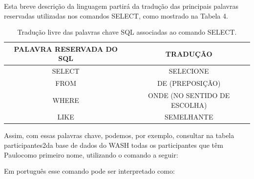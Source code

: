 \documentclass[
12pt,		%
openright,	%
twoside,  %
a4paper,			%
chapter=TITLE,		%
english,			%
french,				%
spanish,			%
brazil				%
]{USPSC-classe/USPSC}
\begin{document}
Esta breve descri\c{c}\~ao da linguagem partir\'a da tradu\c{c}\~ao das principais palavras reservadas utilizadas nos comandos SELECT, como mostrado na Tabela 4.












\begin{table}[htb]
\tiny
\caption{\label{0faf6421bd5dff6b3cb8bedd3f0b4212f1150970}Tradu\c{c}\~ao livre das palavras chave SQL associadas ao comando SELECT.}

\centering
\begin{tabular}{|c|c|}
\hline
PALAVRA RESERVADA DO SQL  &  TRADU\c{C}\~AO \\
\hline
SELECT  &  SELECIONE \\
FROM  &  DE (PREPOSI\c{C}\~AO) \\
WHERE  &  ONDE (NO SENTIDO DE ESCOLHA) \\
LIKE  &  SEMELHANTE \\
\hline
\end{tabular}
\end{table}


Assim, com essas palavras chave, podemos, por exemplo, consultar na tabela \textquotedbl participantes2\textquotedbl   da base de dados do WASH todas os participantes que t\^em \textquotedbl Paulo\textquotedbl  como primeiro nome, utilizando o comando a seguir:









\noindent\begin{center}\mbox{\centering{}}\end{center}


Em portugu\^es esse comando pode ser interpretado como:









\noindent\begin{center}\mbox{\centering{}}\end{center}
\end{document}

